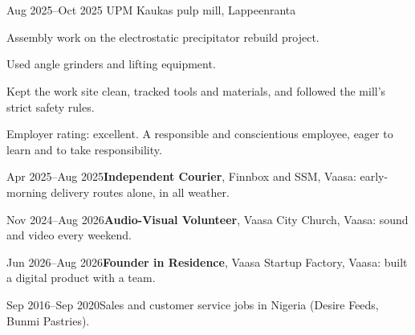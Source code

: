 \documentclass[a4paper,11pt]{article}
\begin{document}
\section{}
\begin{cventry}{Aug 2025--Oct 2025}{}
  UPM Kaukas pulp mill, Lappeenranta\par
  Assembly work on the electrostatic precipitator rebuild project.\par
  Used angle grinders and lifting equipment.\par
  Kept the work site clean, tracked tools and materials, and followed the mill's strict safety rules.\par
  Employer rating: excellent. A responsible and conscientious employee, eager to learn and to take responsibility.
\end{cventry}
\begin{cventry}{Apr 2025--Aug 2025}{\textbf{Independent Courier}, Finnbox and SSM, Vaasa: early-morning delivery routes alone, in all weather.}
\end{cventry}
\begin{cventry}{Nov 2024--Aug 2026}{\textbf{Audio-Visual Volunteer}, Vaasa City Church, Vaasa: sound and video every weekend.}
\end{cventry}
\begin{cventry}{Jun 2026--Aug 2026}{\textbf{Founder in Residence}, Vaasa Startup Factory, Vaasa: built a digital product with a team.}
\end{cventry}
\begin{cventry}{Sep 2016--Sep 2020}{Sales and customer service jobs in Nigeria (Desire Feeds, Bunmi Pastries).}
\end{cventry}

\section{}

\section{}
\end{document}

